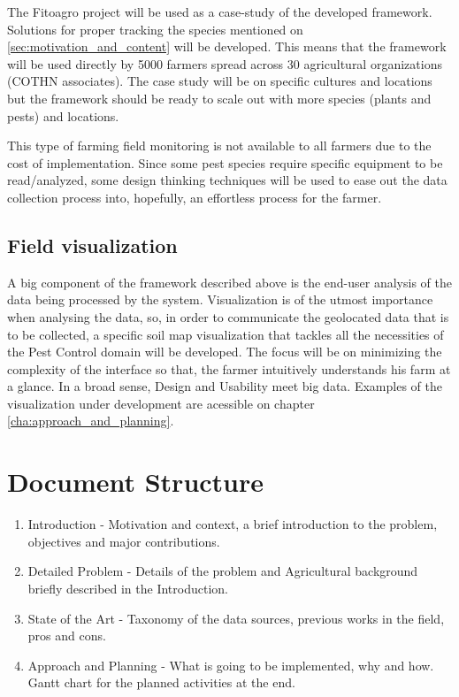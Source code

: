 The Fitoagro project will be used as a case-study of the developed framework. Solutions for proper tracking the species mentioned on \ref{sec:motivation_and_content} will be developed. This means that the framework will be used directly by 5000 farmers spread across 30 agricultural organizations (COTHN associates). The case study will be on specific cultures and locations but the framework should be ready to scale out with more species (plants and pests) and locations.

This type of farming field monitoring is not available to all farmers due to the cost of implementation. Since some pest species require specific equipment to be read/analyzed, some design thinking techniques will be used to ease out the data collection process into, hopefully, an effortless process for the farmer. 

\subsection{Field visualization}
\label{sec:field_visualization}

A big component of the framework described above is the end-user analysis of the data being processed by the system. Visualization is of the utmost importance when analysing the data, so, in order to communicate the geolocated data that is to be collected, a specific soil map visualization that tackles all the necessities of the Pest Control domain will be developed. The focus will be on minimizing the complexity of the interface so that, the farmer intuitively understands his farm at a glance. In a broad sense, Design and Usability meet big data. Examples of the visualization under development are acessible on chapter \ref{cha:approach_and_planning}.

\section{Document Structure} %
\label{sec:document_structure}

\begin{enumerate}
	\item Introduction - Motivation and context, a brief introduction to the problem, objectives and major contributions.
	\item Detailed Problem - Details of the problem and Agricultural background briefly described in the Introduction.
	\item State of the Art - Taxonomy of the data sources, previous works in the field, pros and cons.
	\item Approach and Planning - What is going to be implemented, why and how. Gantt chart for the planned activities at the end.
\end{enumerate}

